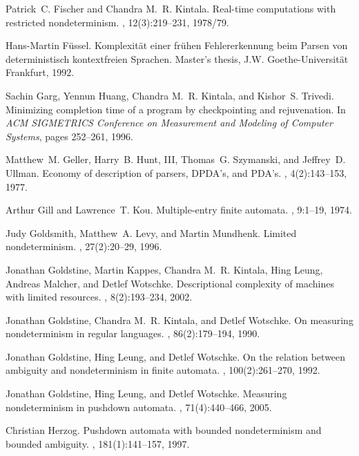 \documentclass[copyright]{eptcs}
\begin{document}
\begin{thebibliography}{10}
Patrick~C. Fischer and Chandra M.~R. Kintala.
\newblock Real-time computations with restricted nondeterminism.
, 12(3):219--231, 1978/79.

Hans-Martin F{\"u}ssel.
\newblock Komplexit{\"a}t einer fr{\"u}hen {F}ehlererkennung beim {P}arsen von
  deterministisch kontextfreien {S}prachen.
\newblock Master's thesis, J.W. Goethe-Universit{\"a}t Frankfurt, 1992.

Sachin Garg, Yennun Huang, Chandra M.~R. Kintala, and Kishor~S. Trivedi.
\newblock Minimizing completion time of a program by checkpointing and
  rejuvenation.
\newblock In {\em ACM SIGMETRICS Conference on Measurement and Modeling of
  Computer Systems}, pages 252--261, 1996.

Matthew~M. Geller, Harry~B. Hunt, III, Thomas~G. Szymanski, and Jeffrey~D.
  Ullman.
\newblock Economy of description of parsers, {D}{P}{D}{A}'s, and {P}{D}{A}'s.
, 4(2):143--153, 1977.

Arthur Gill and Lawrence~T. Kou.
\newblock Multiple-entry finite automata.
, 9:1--19, 1974.

Judy Goldsmith, Matthew~A. Levy, and Martin Mundhenk.
\newblock Limited nondeterminism.
, 27(2):20--29, 1996.

Jonathan Goldstine, Martin Kappes, Chandra M.~R. Kintala, Hing Leung, Andreas
  Malcher, and Detlef Wotschke.
\newblock Descriptional complexity of machines with limited resources.
, 8(2):193--234, 2002.

Jonathan Goldstine, Chandra M.~R. Kintala, and Detlef Wotschke.
\newblock On measuring nondeterminism in regular languages.
, 86(2):179--194, 1990.

Jonathan Goldstine, Hing Leung, and Detlef Wotschke.
\newblock On the relation between ambiguity and nondeterminism in finite
  automata.
, 100(2):261--270, 1992.

Jonathan Goldstine, Hing Leung, and Detlef Wotschke.
\newblock Measuring nondeterminism in pushdown automata.
, 71(4):440--466, 2005.

Christian Herzog.
\newblock Pushdown automata with bounded nondeterminism and bounded ambiguity.
, 181(1):141--157, 1997.


\end{thebibliography}
\end{document}
